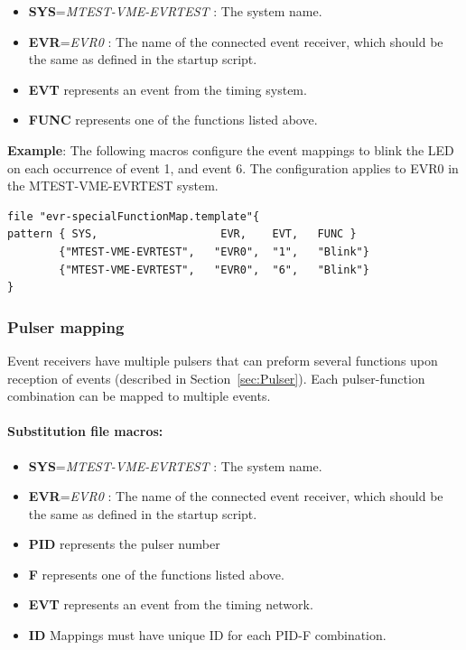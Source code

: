 \documentclass[12pt,a4paper]{article}
\begin{document}
\begin{itemize}
\item
	\textbf{SYS}=\emph{MTEST-VME-EVRTEST} : The system name. 
\item
	\textbf{EVR}=\emph{EVR0} : The name of the connected event receiver, which should be the same as defined in the startup script. 
\item
  \textbf{EVT} represents an event from the timing system.
\item
  \textbf{FUNC} represents one of the functions listed above.
\end{itemize}

\textbf{Example}: The following macros configure the event mappings to blink the LED on each occurrence of event 1, and event 6. The configuration applies to EVR0 in the MTEST-VME-EVRTEST system.

\begin{verbatim}
file "evr-specialFunctionMap.template"{
pattern { SYS,                   EVR,    EVT,   FUNC }
        {"MTEST-VME-EVRTEST",   "EVR0",  "1",   "Blink"}
        {"MTEST-VME-EVRTEST",   "EVR0",  "6",   "Blink"}
}
\end{verbatim}

\subsubsection{Pulser mapping}\label{sec:Pulser mapping}
Event receivers have multiple pulsers that can preform several functions upon reception of events (described in Section~\ref{sec:Pulser}). Each pulser-function combination can be
mapped to multiple events.

\paragraph{Substitution file macros:}
\begin{itemize}
\item
	\textbf{SYS}=\emph{MTEST-VME-EVRTEST} : The system name. 
\item
	\textbf{EVR}=\emph{EVR0} : The name of the connected event receiver, which should be the same as defined in the startup script.
\item
  \textbf{PID} represents the pulser number
\item
  \textbf{F} represents one of the functions listed above.
\item
  \textbf{EVT} represents an event from the timing network.
\item
  \textbf{ID} Mappings must have unique ID for each PID-F combination.
\end{itemize}
\end{document}
